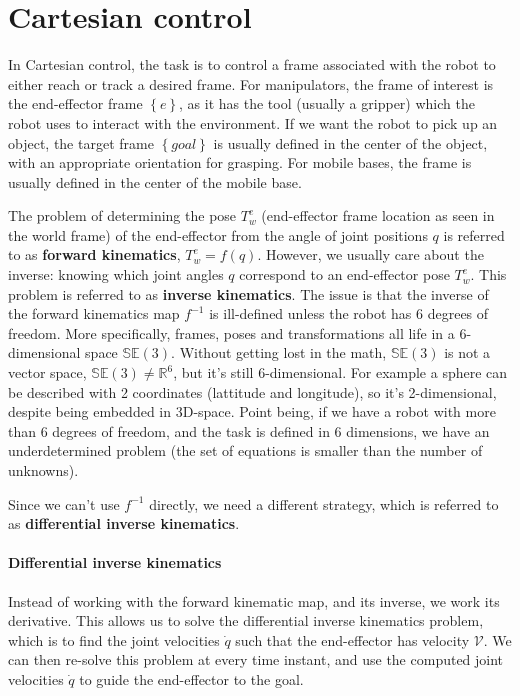 \section{Cartesian control}
In Cartesian control, the task is to control a frame
associated with the robot to either reach or track a desired frame.
For manipulators, the frame of interest is the end-effector frame 
$\left\{e\right\}$,
as it has the tool (usually a gripper) which the robot uses
to interact with the environment. If we want the robot to pick
up an object, the target frame $\left\{goal\right\}$ 
is usually defined in the center
of the object, with an appropriate orientation for grasping.
For mobile bases, the frame is usually defined in the center of
the mobile base. 

The problem of determining the pose $T_w^e$ 
(end-effector frame location
as seen in the world frame) of the end-effector
from the angle of joint positions $q$ is referred
to as \textbf{forward kinematics},
$T_w^e = f(q)$.
However, we usually care about the inverse: knowing which 
joint angles $q$ correspond to an end-effector pose $T_w^e$.
This problem is referred to as \textbf{inverse kinematics}.
The issue is that the inverse of the forward kinematics map $f^{-1}$
is ill-defined unless the robot has 6 degrees of freedom. 
More specifically, frames, poses and transformations all life
in a 6-dimensional space $\mathbb{SE}(3)$.
Without getting lost in the math, $\mathbb{SE}(3)$ is not a vector space,
$\mathbb{SE}(3) \neq \mathbb{R}^6$, but it's still 6-dimensional.
For example a sphere can be described with 2 coordinates (lattitude and 
longitude), so it's 2-dimensional, despite being embedded in 3D-space.
Point being, if we have a robot with more than 6 degrees of freedom,
and the task is defined in 6 dimensions, we have an underdetermined
problem (the set of equations is smaller than the number of unknowns).

Since we can't use $f^{-1}$ directly, we need a different strategy,
which is referred to as \textbf{differential inverse kinematics}.

\paragraph{Differential inverse kinematics}
Instead of working with the forward kinematic map,
and its inverse, we work its derivative. This allows 
us to solve the differential inverse kinematics problem,
which is to find the joint velocities $\dot{q}$ such that
the end-effector has velocity $\mathcal{V}$.
We can then re-solve this problem at every time instant,
and use the computed joint velocities $\dot{q}$ to guide the 
end-effector to the goal.

